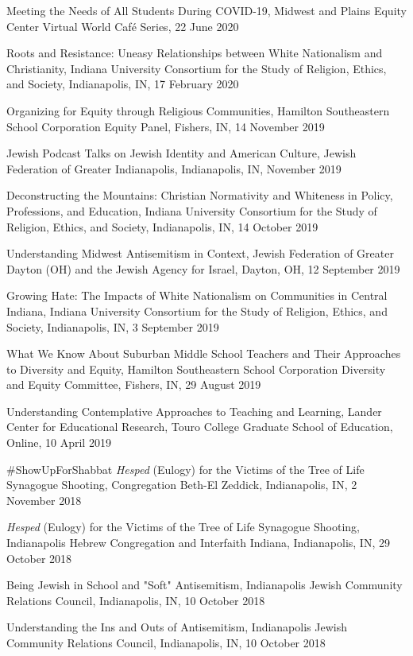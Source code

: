\documentclass[11pt,article,oneside]{memoir}
\begin{document}
\ind Meeting the Needs of All Students During COVID-19, Midwest and Plains Equity Center Virtual World Café Series, 22 June 2020

\ind Roots and Resistance: Uneasy Relationships between White Nationalism and Christianity, Indiana University Consortium for the Study of Religion, Ethics, and Society, Indianapolis, IN, 17 February 2020

\ind Organizing for Equity through Religious Communities, Hamilton Southeastern School Corporation Equity Panel, Fishers, IN, 14 November 2019

\ind Jewish Podcast Talks on Jewish Identity and American Culture, Jewish Federation of Greater Indianapolis, Indianapolis, IN, November 2019

\ind Deconstructing the Mountains: Christian Normativity and Whiteness in Policy, Professions, and Education, Indiana University Consortium for the Study of Religion, Ethics, and Society, Indianapolis, IN, 14 October 2019

\ind Understanding Midwest Antisemitism in Context, Jewish Federation of Greater Dayton (OH) and the Jewish Agency for Israel, Dayton, OH, 12 September 2019

\ind Growing Hate: The Impacts of White Nationalism on Communities in Central Indiana, Indiana University Consortium for the Study of Religion, Ethics, and Society, Indianapolis, IN, 3 September 2019

\ind What We Know About Suburban Middle School Teachers and Their Approaches to Diversity and Equity, Hamilton Southeastern School Corporation Diversity and Equity Committee, Fishers, IN, 29 August 2019

\ind Understanding Contemplative Approaches to Teaching and Learning, Lander Center for Educational Research, Touro College Graduate School of Education, Online, 10 April 2019

\ind \#ShowUpForShabbat \textit{Hesped} (Eulogy) for the Victims of the Tree of Life Synagogue Shooting, Congregation Beth-El Zeddick, Indianapolis, IN, 2 November 2018

\ind \textit{Hesped} (Eulogy) for the Victims of the Tree of Life Synagogue Shooting, Indianapolis Hebrew Congregation and Interfaith Indiana, Indianapolis, IN, 29 October 2018

\ind Being Jewish in School and "Soft" Antisemitism, Indianapolis Jewish Community Relations Council, Indianapolis, IN, 10 October 2018

\ind Understanding the Ins and Outs of Antisemitism, Indianapolis Jewish Community Relations Council, Indianapolis, IN, 10 October 2018
\end{document}
